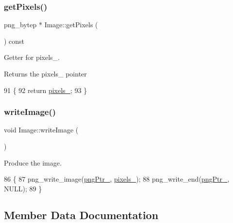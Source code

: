 \subsubsection{\texorpdfstring{get\+Pixels()}{getPixels()}}
{\footnotesize\ttfamily png\+\_\+bytep $\ast$ Image\+::get\+Pixels (\begin{DoxyParamCaption}{ }\end{DoxyParamCaption}) const}



Getter for pixels\+\_\+. 

\begin{DoxyReturn}{Returns}
the pixels\+\_\+ pointer 
\end{DoxyReturn}

\begin{DoxyCode}
91                                   \{
92     \textcolor{keywordflow}{return} \mbox{\hyperlink{class_image_a51351c8507499d09cb9667c20ef01faf}{pixels\_}};
93 \}
\end{DoxyCode}
\mbox{\label{class_image_ac34bdffd357a50025e6a72deb02596b5}} 
\subsubsection{\texorpdfstring{write\+Image()}{writeImage()}}
{\footnotesize\ttfamily void Image\+::write\+Image (\begin{DoxyParamCaption}{ }\end{DoxyParamCaption})}



Produce the image. 


\begin{DoxyCode}
86                        \{
87     png\_write\_image(\mbox{\hyperlink{class_image_aaf607d2596bac09b13370599d9ba6d8c}{pngPtr\_}}, \mbox{\hyperlink{class_image_a51351c8507499d09cb9667c20ef01faf}{pixels\_}});
88     png\_write\_end(\mbox{\hyperlink{class_image_aaf607d2596bac09b13370599d9ba6d8c}{pngPtr\_}}, NULL);
89 \}
\end{DoxyCode}


\subsection{Member Data Documentation}
\mbox{\label{class_image_a1f1849b27396edcc169e7d717ef0e6ab}} 
